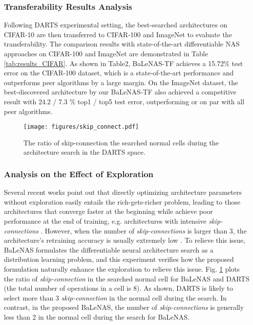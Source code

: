 \documentclass[10pt,twocolumn,letterpaper]{article}
\begin{document}
\subsubsection{Transferability Results Analysis}
\label{sec4.2.2}
Following DARTS experimental setting, the best-searched architectures on CIFAR-10 are then transferred to CIFAR-100 and ImageNet to evaluate the transferability. The comparison results with state-of-the-art differentiable NAS approaches on CIFAR-100 and ImageNet are demonstrated in Table \ref{tab:results_CIFAR}. As shown in Table2, BaLeNAS-TF achieves a 15.72\% test error on the CIFAR-100 dataset, which is a state-of-the-art performance and outperforms peer algorithms by a large margin. On the ImageNet dataset, the best-discovered architecture by our BaLeNAS-TF also achieved a competitive result with 24.2 / 7.3 \% top1 / top5 test error, outperforming or on par with all peer algorithms. 
\vspace{-2mm}



\begin{figure}
\centering
      \texttt{[image: figures/skip\_connect.pdf]}
 \caption{The ratio of skip-connection the searched normal cells during the architecture search in the DARTS space.}
 \label{fig:skip}
 \vspace{-2mm} 
\end{figure}


\subsubsection{Analysis on the Effect of Exploration}
Several recent works \cite{shu2019understanding,chen2020drnas,zhang2020one} point out that directly optimizing architecture parameters without exploration easily entails the rich-gets-richer problem, leading to those architectures that converge faster at the beginning while achieve poor performance at the end of training, e.g. architectures with intensive \textit{skip-connections} \cite{chu2019fairnas,liang2019darts+}. However, when the number of \textit{skip-connections} is larger than 3, the architecture's retraining accuracy is usually extremely low \cite{liang2019darts+,zela2019understanding}. To relieve this issue, BaLeNAS formulates the differentiable neural architecture search as a distribution learning problem, and this experiment verifies how the proposed formulation naturally enhance the exploration to relieve this issue. Fig. \ref{fig:skip} plots the ratio of \textit{skip-connection} in the searched normal cell for BaLeNAS and DARTS (the total number of operations in a cell is 8). As shown, DARTS is likely to select more than 3 \textit{skip-connection} in the normal cell during the search. In contrast, in the proposed BaLeNAS, the number of \textit{skip-connections} is generally less than 2 in the normal cell during the search for BaLeNAS.
\end{document}
